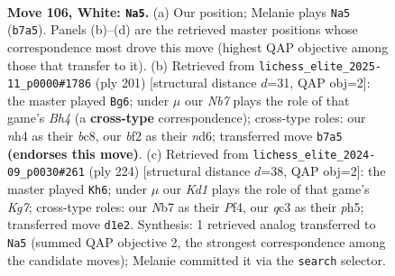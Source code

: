 \documentclass[11pt]{article}
\begin{document}
\begin{figure}[p]\centering
\begin{subfigure}{0.46\textwidth}\centering
\resizebox{\linewidth}{!}{%
\newchessgame
\chessboard[
  setfen={5k2/1N6/n7/8/Pp2P2n/2q5/B4b1p/3K4 w - - 4 106},
  showmover=false,
  pgfstyle=straightmove, color=movearrow, markmove={b7-a5}
]}
\caption{}
\end{subfigure}\hfill
\begin{subfigure}{0.46\textwidth}\centering
\resizebox{\linewidth}{!}{%
\newchessgame
\chessboard[
  setfen={2B5/8/3N4/7b/3k1p1p/7P/r7/6K1 b - - 11 101},
  showmover=false,
  pgfstyle=straightmove, color=movearrow, markmove={h5-g6}
]}
\caption{}
\end{subfigure}
\\[4pt]
\begin{subfigure}{0.46\textwidth}\centering
\resizebox{\linewidth}{!}{%
\newchessgame
\chessboard[
  setfen={8/3k2K1/pP4p1/7p/1B2bP1P/8/8/8 w - - 7 113},
  showmover=false,
  pgfstyle=straightmove, color=movearrow, markmove={g7-h6}
]}
\caption{}
\end{subfigure}\hfill

\caption{\textbf{Move 106, White: \texttt{Na5}.} (a) Our position; Melanie plays \texttt{Na5} (\texttt{b7a5}). Panels (b)--(d) are the retrieved master positions whose correspondence most drove this move (highest QAP objective among those that transfer to it). (b) Retrieved from \texttt{lichess\_elite\_2025-11\_p0000\#1786} (ply 201) [structural distance $d$=31, QAP obj=2]: the master played \texttt{Bg6}; under $\mu$ our \emph{Nb7} plays the role of that game's \emph{Bh4} (a \textbf{cross-type} correspondence); cross-type roles: our \emph{n}h4 as their \emph{b}c8, our \emph{b}f2 as their \emph{n}d6; transferred move \texttt{b7a5} \textbf{(endorses this move)}. (c) Retrieved from \texttt{lichess\_elite\_2024-09\_p0030\#261} (ply 224) [structural distance $d$=38, QAP obj=2]: the master played \texttt{Kh6}; under $\mu$ our \emph{Kd1} plays the role of that game's \emph{Kg7}; cross-type roles: our \emph{N}b7 as their \emph{P}f4, our \emph{q}c3 as their \emph{p}h5; transferred move \texttt{d1e2}. Synthesis: 1 retrieved analog transferred to \texttt{Na5} (summed QAP objective 2, the strongest correspondence among the candidate moves); Melanie committed it via the \texttt{search} selector.}
\label{fig:thought-m210}
\end{figure}

\clearpage
\end{document}

